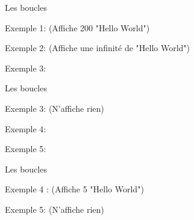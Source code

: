

	
	\begin{frame}{Les boucles}
		\begin{center}
			\begin{minipage}[t]{0.8\linewidth}
				Exemple 1: (\alert{Affiche 200 "Hello World"})
				\forExmpOne
			\end{minipage}
			\begin{minipage}[t]{0.8\linewidth}
				Exemple 2: (\alert{Affiche une infinité de "Hello World"})
				\forExmpTwo
			\end{minipage}
			\begin{minipage}[t]{0.8\linewidth}
				Exemple 3:
				\forExmpThree
			\end{minipage}
		\end{center}
	\end{frame}
	
	\begin{frame}{Les boucles}	
		\begin{minipage}[t]{0.8\linewidth}
			Exemple 3: (\alert{N'affiche rien})
			\forExmpThree
		\end{minipage}
		\begin{minipage}[t]{0.8\linewidth}
			Exemple 4:
			\forExmpFour
		\end{minipage}
		\begin{minipage}[t]{0.8\linewidth}
			Exemple 5:
			\forExmpFive
		\end{minipage}
	\end{frame}

	\begin{frame}{Les boucles}
		\begin{minipage}[t]{0.8\linewidth}
			Exemple 4 :  (\alert{Affiche 5 "Hello World"})
			\forExmpFour
		\end{minipage}
		\begin{minipage}[t]{0.8\linewidth}
			Exemple 5: (\alert{N'affiche rien})
			\forExmpFive
		\end{minipage}
	\end{frame}

